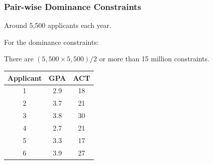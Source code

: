 \documentclass[aspectratio=169]{beamer}
\begin{document}
\begin{frame}
\frametitle{Pair-wise Dominance Constraints}
Around 5,500 applicants each year.

For the dominance constraints:

There are $(5,500 \times 5,500) / 2$ or 
more than 15 million constraints.

\begin{table}[H]
\centering
\begin{tabular}{|c|c|c|}
\hline
  Applicant & GPA & ACT \\ [0.5ex] 
\hline
1 & 2.9 & 18 \\ \hline
2 & 3.7 & 21 \\ \hline
3 & 3.8 & 30 \\ \hline
4 & 2.7 & 21 \\ \hline
5 & 3.3 & 17 \\ \hline
6 & 3.9 & 27 \\ \hline
\end{tabular}

\end{table}

\end{frame}
\end{document}
